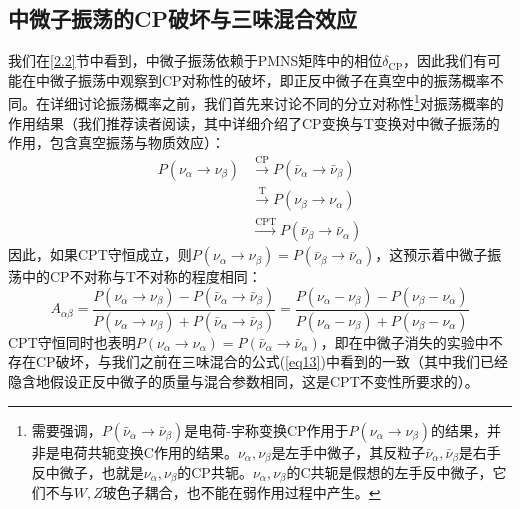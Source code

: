 \documentclass{article}
\begin{document}
	\subsection{中微子振荡的CP破坏与三味混合效应\label{2.3}}
	我们在\ref{2.2}节中看到，中微子振荡依赖于PMNS矩阵中的相位$\delta_\mathrm{CP}$，因此我们有可能在中微子振荡中观察到CP对称性的破坏\cite{cabibbo1978time}，即正反中微子在真空中的振荡概率不同。在详细讨论振荡概率之前，我们首先来讨论不同的分立对称性\footnote{需要强调，$P(\bar{\nu}_\alpha\to\bar{\nu}_\beta)$是电荷-宇称变换CP作用于$P(\nu_\alpha\to\nu_\beta)$的结果，并非是电荷共轭变换C作用的结果。$\nu_\alpha,\nu_\beta$是左手中微子，其反粒子$\bar{\nu}_\alpha,\bar{\nu}_\beta$是右手反中微子，也就是$\nu_\alpha,\nu_\beta$的CP共轭。$\nu_\alpha,\nu_\beta$的C共轭是假想的左手反中微子，它们不与$W,Z$玻色子耦合，也不能在弱作用过程中产生。}对振荡概率的作用结果（我们推荐读者阅读\cite{akhmedov2005three}，其中详细介绍了CP变换与T变换对中微子振荡的作用，包含真空振荡与物质效应）：
	\begin{align}
		P(\nu_\alpha\to\nu_\beta)&\stackrel{\mathrm{CP}}{\longrightarrow} P(\bar{\nu}_\alpha\to\bar{\nu}_\beta)\\
		&\stackrel{\mathrm{T}}{\longrightarrow} P(\nu_\beta\to\nu_\alpha)\\
		&\stackrel{\mathrm{CPT}}{\longrightarrow} P(\bar{\nu}_\beta\to\bar{\nu}_\alpha)
	\end{align}
	因此，如果CPT守恒成立，则$P(\nu_\alpha\to\nu_\beta)=P(\bar{\nu}_\beta\to\bar{\nu}_\alpha)$，这预示着中微子振荡中的CP不对称与T不对称的程度相同：
	\begin{equation}
		A_{\alpha\beta}=\frac{P(\nu_\alpha\to\nu_\beta)-P(\bar{\nu}_\alpha\to\bar{\nu}_\beta)}{P(\nu_\alpha\to\nu_\beta)+P(\bar{\nu}_\alpha\to\bar{\nu}_\beta)}=\frac{P(\nu_\alpha-\nu_\beta)-P(\nu_\beta-\nu_\alpha)}{P(\nu_\alpha-\nu_\beta)+P(\nu_\beta-\nu_\alpha)}
	\end{equation}
	CPT守恒同时也表明$P(\nu_\alpha\to\nu_\alpha)=P(\bar{\nu}_\alpha\to\bar{\nu}_\alpha)$，即在中微子消失的实验中不存在CP破坏，与我们之前在三味混合的公式(\ref{eq13})中看到的一致（其中我们已经隐含地假设正反中微子的质量与混合参数相同，这是CPT不变性所要求的）。
	
\end{document}
